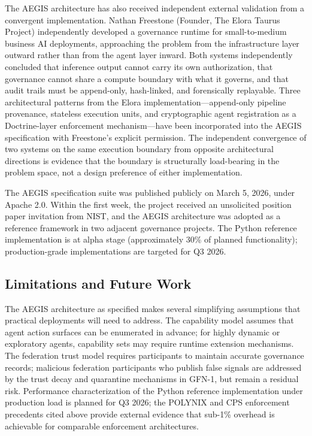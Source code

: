 \documentclass{IEEEcsmag}
\begin{document}
The AEGIS architecture has also received independent external validation from a convergent implementation. Nathan Freestone (Founder, The Elora Taurus Project) independently developed a governance runtime for small-to-medium business AI deployments, approaching the problem from the infrastructure layer outward rather than from the agent layer inward. Both systems independently concluded that inference output cannot carry its own authorization, that governance cannot share a compute boundary with what it governs, and that audit trails must be append-only, hash-linked, and forensically replayable. Three architectural patterns from the Elora implementation---append-only pipeline provenance, stateless execution units, and cryptographic agent registration as a Doctrine-layer enforcement mechanism---have been incorporated into the AEGIS specification with Freestone's explicit permission. The independent convergence of two systems on the same execution boundary from opposite architectural directions is evidence that the boundary is structurally load-bearing in the problem space, not a design preference of either implementation.

The AEGIS specification suite was published publicly on March 5, 2026, under Apache 2.0. Within the first week, the project received an unsolicited position paper invitation from NIST, and the AEGIS architecture was adopted as a reference framework in two adjacent governance projects. The Python reference implementation is at alpha stage (approximately 30\% of planned functionality); production-grade implementations are targeted for Q3 2026.

\subsection{Limitations and Future Work}

The AEGIS architecture as specified makes several simplifying assumptions that practical deployments will need to address. The capability model assumes that agent action surfaces can be enumerated in advance; for highly dynamic or exploratory agents, capability sets may require runtime extension mechanisms. The federation trust model requires participants to maintain accurate governance records; malicious federation participants who publish false signals are addressed by the trust decay and quarantine mechanisms in GFN-1, but remain a residual risk. Performance characterization of the Python reference implementation under production load is planned for Q3 2026; the POLYNIX and CPS enforcement precedents cited above provide external evidence that sub-1\% overhead is achievable for comparable enforcement architectures.
\end{document}

